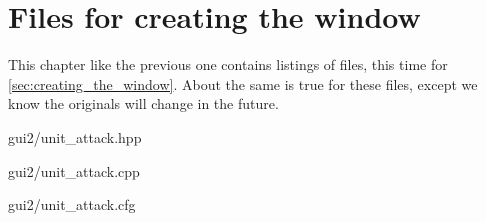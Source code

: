 \chapter{Files for creating the window}

This chapter like the previous one contains listings of files, this time for
\cref{sec:creating_the_window}. About the same is true for these files, except
we know the originals will change in the future.


	{gui2/unit_attack.hpp}


	{gui2/unit_attack.cpp}


	{gui2/unit_attack.cfg}

